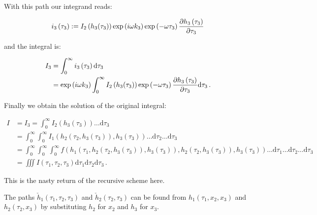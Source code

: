 \documentclass[a4paper,10pt]{article}
\begin{document}
With this path our integrand reads:

\begin{equation}
 i_3\left(\tau_3\right) := I_2\left(h_3(\tau_3)\right) \exp\left(i \omega k_3 \right)
                           \exp\left(- \omega \tau_3 \right) \frac{\partial h_3\left(\tau_3\right)}{\partial \tau_3}
\end{equation}

and the integral is:

\begin{equation}
\begin{split}
  I_3 & = \int_0^{\infty} i_3\left(\tau_3\right) \mathrm{d}\tau_3 \\
      & = \exp\left(i \omega k_3\right)
          \int_0^{\infty} I_2\left(h_3(\tau_3)\right)
                          \exp\left(- \omega \tau_3 \right)
                          \frac{\partial h_3\left(\tau_3\right)}{\partial \tau_3}
          \mathrm{d}\tau_3 \,.
\end{split}
\end{equation}


Finally we obtain the solution of the original integral:

\begin{equation}
\begin{split}
  I & = I_3 = \int_0^{\infty} I_2\left(h_3(\tau_3)\right) \ldots \mathrm{d}\tau_3 \\
    & = \int_0^{\infty}
          \int_0^{\infty} I_1\left(h_2(\tau_2, h_3(\tau_3)), h_3(\tau_3)\right)
          \ldots \mathrm{d}\tau_2
        \ldots \mathrm{d}\tau_3 \\
    & = \int_0^{\infty}
          \int_0^{\infty}
            \int_0^{\infty} f\left(h_1(\tau_1, h_2(\tau_2, h_3(\tau_3)), h_3(\tau_3)),
                                   h_2(\tau_2, h_3(\tau_3)),
                                   h_3(\tau_3)
                             \right)
            \ldots \mathrm{d}\tau_1
          \ldots \mathrm{d}\tau_2
        \ldots \mathrm{d}\tau_3 \\
    & = \iiint I\left(\tau_1, \tau_2, \tau_3\right) \mathrm{d}\tau_1 \mathrm{d}\tau_2 \mathrm{d}\tau_3 \,.
\end{split}
\end{equation}

This is the nasty return of the recursive scheme here.

The paths $\check{h}_1\left(\tau_1, \tau_2, \tau_3\right)$ and
$\check{h}_2\left(\tau_2, \tau_3\right)$ can be found from
$h_1\left(\tau_1, x_2, x_3\right)$ and $h_2\left(\tau_2, x_3\right)$
by substituting $h_2$ for $x_2$ and $h_3$ for $x_3$.
\end{document}
